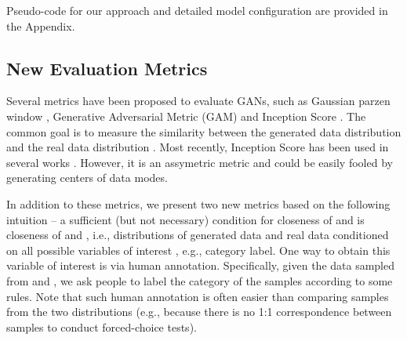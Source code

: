 \documentclass{article} \usepackage{iclr2017_conference,times}
\newcommand*\Let[2]{\State #1  #2}
\begin{document}
Pseudo-code for our approach and detailed model configuration are provided in the Appendix. 
\begin{comment}
Finally, Algo.~\ref{algorithm} provides the in depth generative process accomplished by the generator. In the algorithm, we define some operators:    evaluates the function  at .   is a composition operator that composes its operands so that . 
\begin{algorithm}
\caption{Stochastic Data Generation}
\begin{algorithmic}[1]
\State 
\State   \Comment{background generator} 
\For  { }
\State 
\Let{}{LSTM[]} \Comment{encoding with LSTM} 
\If{t = 1 }
   \Let{}{}
  \Else
    \Let{}{[  ]} \Comment{concat the two inputs}
 \EndIf
   \Let{}{ } \Comment{ latent shared representation of object layer}
     \Let{}{ } \Comment{ object appearance }
        \Let{}{ } \Comment{ object shape}
        \Let{}{} \Comment{ object transformation}
        \Let{ }{ } \Comment{ shared represenation embedding }
        \Let{}{}
\EndFor
\end{algorithmic}
\label{algorithm}
\end{algorithm}
\end{comment}

\subsection{New Evaluation Metrics}
\vspace{-5pt}
Several metrics have been proposed to evaluate GANs, such as Gaussian parzen window \citep{GAN}, Generative Adversarial Metric (GAM) \citep{GRAN} and Inception Score \citep{ImprovedGAN}. The common goal is to measure the similarity between the generated data distribution  and the real data distribution .  Most recently, Inception Score has been used in several works \citep{ImprovedGAN, EBGAN}. However, it is an assymetric metric and could be easily fooled by generating centers of data modes.

In addition to these metrics, we present two new metrics based on the following intuition -- a sufficient (but not necessary) condition for closeness of  and  is closeness of  and , i.e., distributions of generated data and real data conditioned on all possible variables of interest , e.g., category label. One way to obtain this variable of interest  is via human annotation. Specifically, given the data sampled from  and , we ask people to label the category of the samples according to some rules. Note that such human annotation is often easier than comparing samples from the two distributions (e.g., because there is no 1:1 correspondence between samples to conduct forced-choice tests). 
\end{document}
